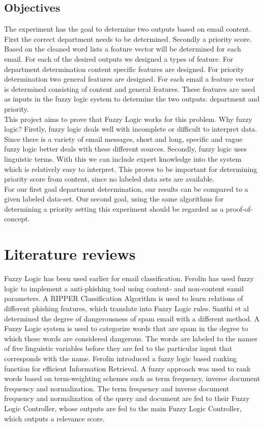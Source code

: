 \documentclass[journal]{IEEEtran}
\begin{document}
\subsection{Objectives}

The experiment has the goal to determine two outputs based on email content. First the correct department needs to be determined. Secondly a priority score. Based on the cleaned word lists a feature vector will be determined for each email. For each of the desired outputs we designed a types of feature. For department determination content specific features are designed. For priority determination two general features are designed. For each email a feature vector is determined consisting of content and general features. These features are used as inputs in the fuzzy logic system to determine the two outputs: department and priority. \\

This project aims to prove that Fuzzy Logic works for this problem. Why fuzzy logic? Firstly, fuzzy logic deals well with incomplete or difficult to interpret data. Since there is a variety of email messages, short and long, specific and vague fuzzy logic better deals with these different sources. Secondly, fuzzy logic uses linguistic terms. With this we can include expert knowledge into the system which is relatively easy to interpret. This proves to be important for determining priority score from content, since no labeled data sets are available.\\

For our first goal department determination, our results can be compared to a given labeled data-set. Our second goal, using the same algorithms for determining a priority setting this experiment should be regarded as a proof-of-concept.  

\section{Literature reviews}

Fuzzy Logic has been used earlier for email classification. Ferolin \cite{phishing} 
has used fuzzy logic to implement a anti-phishing tool using content- and non-content eamil parameters. A RIPPER Classification Algorithm is used to learn relations of different phishing features, which translate into Fuzzy Logic rules. Santhi et al \cite{spam} determined the degree of dangerousness of spam email with a different method. A Fuzzy Logic system is used to categorize words that are spam in the degree to which these words are considered dangerous. The words are labeled to the names of five linguistic variables before they are fed to the particular input that corresponds with the name. Ferolin \cite{ranking} introduced a fuzzy logic based ranking function for efficient Information Retrieval. A fuzzy approach was used to rank words based on term-weighting schemes such as term frequency, inverse document frequency and normalization. The term frequency and inverse document frequency and normalization of the query and document are fed to their Fuzzy Logic Controller, whose outputs are fed to the main Fuzzy Logic Controller, which outputs a relevance score.
\end{document}
